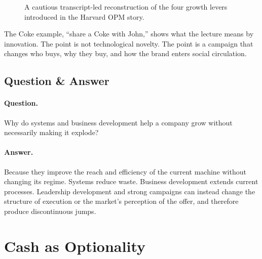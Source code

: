 \begin{figure}[h]
\centering
{}
\caption{A cautious transcript-led reconstruction of the four growth levers introduced in the Harvard OPM story.}
\end{figure}

The Coke example, ``share a Coke with John,'' shows what the lecture means by innovation. The point is not technological novelty. The point is a campaign that changes who buys, why they buy, and how the brand enters social circulation.

\subsection{Question \& Answer}

\paragraph{Question.} Why do systems and business development help a company grow without necessarily making it explode?

\paragraph{Answer.} Because they improve the reach and efficiency of the current machine without changing its regime. Systems reduce waste. Business development extends current processes. Leadership development and strong campaigns can instead change the structure of execution or the market's perception of the offer, and therefore produce discontinuous jumps.

\section{Cash as Optionality}

